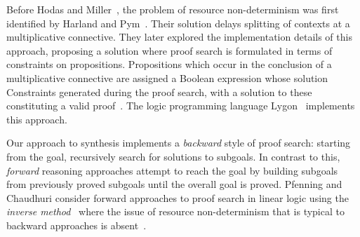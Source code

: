 Before Hodas and Miller~\cite{HODAS1994327}, the problem of resource
non-determinism was first identified by Harland and Pym~\cite{harlandpym}. 
Their solution delays splitting of contexts at a multiplicative connective. 
They later explored the implementation details of this approach, proposing a 
solution where proof search is formulated in terms of constraints on 
propositions. Propositions which occur in the conclusion of a multiplicative 
connective are assigned a Boolean expression whose solution Constraints 
generated during the proof search, with a solution to these constituting a 
valid proof~\cite{harlandpym}. The logic programming language 
Lygon~\cite{lygon} implements this approach. 

Our approach to synthesis implements a \textit{backward} style of proof search:
starting from the goal, recursively search for solutions to subgoals. In
contrast to this, \textit{forward} reasoning approaches attempt to reach the
goal by building subgoals from previously proved subgoals until the overall goal
is proved. Pfenning and Chaudhuri consider forward approaches to proof search in
linear logic using the \textit{inverse method}~\cite{DEGTYAREV2001179} where the
issue of resource non-determinism that is typical to backward approaches is
absent~\cite{10.1007/11532231_6,10.1007/11538363_15}.